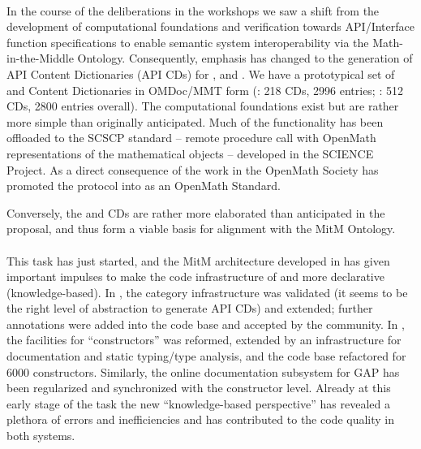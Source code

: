 \documentclass{deliverablereport}
\begin{document}
  \paragraph{}
  In the course of the deliberations in the  workshops we saw a shift from
  the development of computational foundations and verification towards API/Interface
  function specifications to enable semantic system interoperability via the
  Math-in-the-Middle Ontology. Consequently, emphasis has changed to the generation of API
  Content Dictionaries (API CDs) for \GAP, \LMFDB and \Sage. We have a prototypical set
  of \GAP and \Sage Content Dictionaries in OMDoc/MMT form (\GAP: 218 CDs, 2996 entries;
  \Sage: 512 CDs, 2800 entries overall). The computational foundations exist but are rather
  more simple than originally anticipated. Much of the functionality has been offloaded to
  the SCSCP standard -- remote procedure call with OpenMath representations of the
  mathematical objects -- developed in the SCIENCE Project. As a direct consequence of the
  work in \pn the OpenMath Society has promoted the \SCSCP protocol into as an OpenMath
  Standard.
  
  Conversely, the \GAP and \Sage CDs are rather more elaborated than anticipated in the
  proposal, and thus form a viable basis for alignment with the MitM Ontology.

  \paragraph{}
  This task has just started, and the MitM architecture developed in  has
  given important impulses to make the code infrastructure of \Sage and \GAP more
  declarative (knowledge-based). In \Sage, the category infrastructure was validated (it
  seems to be the right level of abstraction to generate API CDs) and extended; further
  annotations were added into the \Sage code base and accepted by the
  community. %
  In \GAP,
  the facilities for ``constructors'' was reformed, extended by an infrastructure for
  documentation and static typing/type analysis, and the code base refactored for 6000
  constructors. Similarly, the online documentation subsystem for GAP has been regularized
  and synchronized with the constructor level. Already at this early stage of the task the
  new ``knowledge-based perspective'' has revealed a plethora of errors and inefficiencies
  and has contributed to the code quality in both systems. 
\end{document}
